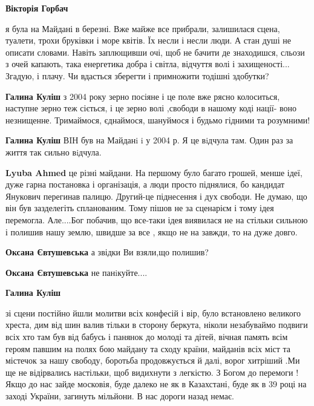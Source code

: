\begin{itemize}
\begin{itemize}
\textbf{Вікторія Горбач} 

я була на Майдані в березні. Вже майже все прибрали, залишилася сцена, туалети,
трохи бруківки і море квітів. Їх несли і несли люди. А стан душі не описати
словами. Навіть заплющивши очі, щоб не бачити де знаходишся, сльози з очей
капають, така енергетика добра і світла, відчуття волі і захищеності... Згадую,
і плачу. Чи вдасться зберегти і примножити тодішні здобутки?

\begin{itemize} %
\textbf{Галина Куліш} з 2004 року зерно посіяне і це поле вже рясно колоситься, наступне зерно теж сіється, і це зерно волі ,свободи в нашому коді нації- воно незнищенне. Тримаймося, єднаймося, шануймося і будьмо гідними та розумними!
\end{itemize} %

\textbf{Галина Куліш} ВIН був на Майданi i у 2004 р. Я це вiдчула там. Один раз за життя так сильно вiдчула.

\begin{itemize} %
\textbf{Lyuba Ahmed} це різні майдани. На першому було багато грошей, менше ідеї, дуже гарна постановка і організація, а люди просто піднялися, бо кандидат Янукович перегинав палицю. Другий-це піднесення і дух свободи. Не думаю, що він був зазделегіть спланованим. Тому пішов не за сценарієм і тому ідея перемогла. Але....Бог побачив, що все-таки ідея виявилася не на стільки сильною і полишив нашу землю, швидше за все , якщо не на завжди, то на дуже довго.

\textbf{Оксана Євтушевська} а звідки Ви взяли,що полишив?

\textbf{Оксана Євтушевська} не панiкуйте....
\end{itemize} %

\textbf{Галина Куліш} 

зі сцени постійно йшли молитви всіх конфесій і вір, було встановлено великого
хреста, дим від шин валив тільки в сторону беркута, ніколи незабуваймо
подвиги всіх хто там був від бабусь і панянок до молоді та дітей, вічная память
всім героям павшим на полях бою майдану та сходу країни, майданів всіх міст та
містечок за нашу свободу, боротьба продовжується й далі, ворог хитріший .Ми ще
не відірвались настільки, щоб видихнути з легкістю. З Богом до перемоги ! Якщо
до нас зайде московія, буде далеко не як в Казахстані, буде як в 39 році на
заході України, загинуть мільйони. В нас дороги назад немає.



\end{itemize}
\end{itemize}
